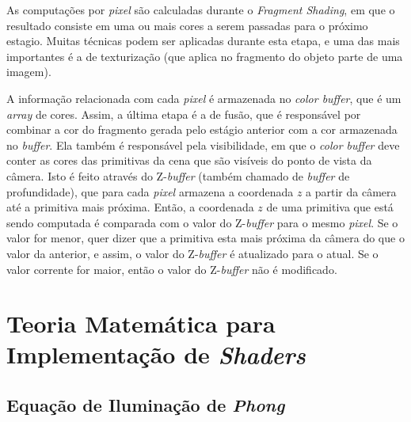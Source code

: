 	As computações por \textit{pixel} são calculadas durante o \textit{Fragment Shading}, em que o resultado consiste em uma ou mais cores a serem passadas para o próximo estagio. Muitas técnicas podem ser aplicadas durante esta etapa, e uma das mais importantes é a de texturização (que aplica no fragmento do objeto parte de uma imagem). 

	 A informação relacionada com cada \textit{pixel} é armazenada no \textit{color buffer}, que é um \textit{array} de cores. Assim, a última etapa é a de fusão, que é responsável por combinar a cor do fragmento gerada pelo estágio anterior com a cor armazenada no \textit{buffer}. Ela também é responsável pela visibilidade, em que o \textit{color buffer} deve conter as cores das primitivas da cena que são visíveis do ponto de vista da câmera. Isto é feito através do Z-\textit{buffer} (também chamado de \textit{buffer} de profundidade), que para cada \textit{pixel} armazena a coordenada $z$ a partir da câmera até a primitiva mais próxima.  Então, a coordenada $z$ de uma primitiva que está sendo computada é comparada com  o valor do Z-\textit{buffer} para o mesmo \textit{pixel}. Se o valor for menor, quer dizer que a primitiva esta mais próxima da câmera do que o valor da anterior, e assim, o valor do Z-\textit{buffer} é atualizado para o atual. Se o valor corrente for maior, então o valor do Z-\textit{buffer} não é modificado. 


\section{Teoria Matemática para Implementação de \textit{Shaders}}

	\subsection{Equação de Iluminação de \textit{Phong}}
	\label{flatgouphon}

